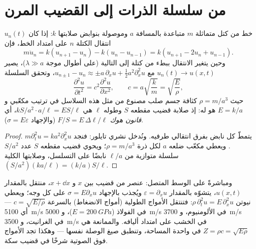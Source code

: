 \section{من سلسلة الذرات إلى القضيب المرن}

\begin{proposition}\label{prop:b2:waves-on-strings:chain}
خط من كتل متماثلة $m$ متباعدة بالمسافة $a$ وموصولة بنوابض
صلابتها $k$: إذا كان $u_n(t)$ انتقال الكتلة $n$ على امتداد
الخط، فإن
\[
m\ddot u_n = k(u_{n+1} - u_n) - k(u_n - u_{n-1}) = k(u_{n+1} - 2u_n + u_{n-1}) .
\]
وحين يتغير الانتقال ببطء من كتلة إلى التالية (على
أطوال موجة $\lambda \gg a$)، يصير $u_n(t) \to u(x, t)$ مع $u_{n\pm1} - u_n \approx
\pm a\,\partial_xu + \tfrac12a^2\partial_x^2u$، وتحقق السلسلة 
\[
\frac{\partial^2u}{\partial t^2} = c^2\frac{\partial^2u}{\partial x^2} , \qquad
c = a\sqrt{\frac km} = \sqrt{\frac{E}{\rho}} ,
\]
حيث $\rho = m/a^3$ كثافة جسم صلب مصنوع من مثل هذه السلاسل في
ترتيب مكعّبي و $E = k/a$ هو \emph{} له: إذ صلابة
قضيب مقطعه $S$ وطوله $\ell$ هي $kS/a^2\cdot a/\ell = ES/\ell$،
أي \emph{قانون هوك} $F/S = E\,\Delta\ell/\ell$ (والإجهاد $\sigma = E\varepsilon$).
\end{proposition}

\begin{proof}
يتمطّ كل نابض بفرق انتقالي طرفيه. ونُدخل نشري تايلور: فنجد
$m\partial_t^2u = ka^2\partial_x^2u$. ويعطي مكعّب ضلعه
$a$ لكل ذرة $\rho = m/a^3$؛ ويحوي قضيب مقطعه $S$ عدد
$S/a^2$ سلسلة متوازية من $\ell/a$ نابضًا على التسلسل، وصلابتها الكلية
$(S/a^2)(ka/\ell) = (k/a)S/\ell$.
\end{proof}

\begin{proposition}\label{prop:b2:waves-on-strings:rod}
ومباشرةً على الوسط المتصل: عنصر من قضيب بين $x$ و $x +
\dd x$، منتقل بالمقدار $u(x, t)$، يتشوّه بالمقدار $\varepsilon = \partial_xu$ ويُجذب
بالإجهاد $\sigma = E\partial_xu$ على كل وجه؛ ويعطي نيوتن $\rho\,\partial_t^2u =
E\,\partial_x^2u$: فتنتقل الأمواج الطولية (أمواج الانضغاط) بالسرعة $c = \sqrt{E/\rho}$
--- أي \qty{5100}{m/s} في الفولاذ ($E = \qty{200}{GPa}$)، و \qty{5000}{m/s} في الألومنيوم،
و \qty{3700}{m/s} في الغرانيت، و \qty{3500}{m/s} في الخشب على امتداد أليافه. والممانعة
هي $Z = \rho c = \sqrt{E\rho}$ في واحدة المساحة، وتنطبق صيغ
الوصلة نفسها --- وهكذا تجد الأمواج فوق الصوتية شرخًا في
قضيب سكة.
\end{proposition}

